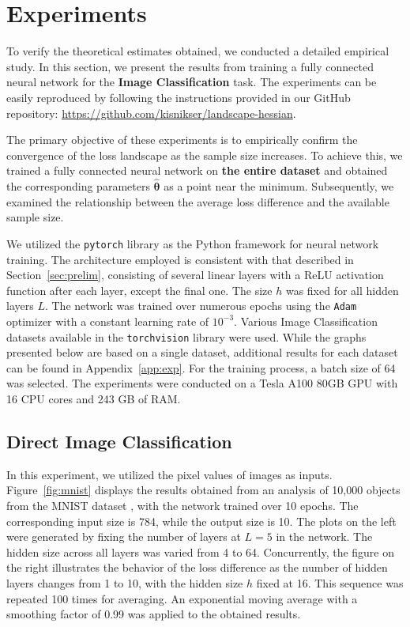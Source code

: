 \documentclass{article}
\begin{document}
\section{Experiments}\label{sec:exp}

To verify the theoretical estimates obtained, we conducted a detailed empirical study. In this section, we present the results from training a fully connected neural network for the \textbf{Image Classification} task. The experiments can be easily reproduced by following the instructions provided in our GitHub repository: \href{https://github.com/kisnikser/landscape-hessian}{https://github.com/kisnikser/landscape-hessian}.

The primary objective of these experiments is to empirically confirm the convergence of the loss landscape as the sample size increases. To achieve this, we trained a fully connected neural network on \textbf{the entire dataset} and obtained the corresponding parameters $\hat{\boldsymbol{\theta}}$ as a point near the minimum. Subsequently, we examined the relationship between the average loss difference and the available sample size.

We utilized the \texttt{pytorch} library \cite{pytorch} as the Python framework for neural network training. The architecture employed is consistent with that described in Section~\ref{sec:prelim}, consisting of several linear layers with a ReLU activation function after each layer, except the final one. The size $h$ was fixed for all hidden layers $L$. The network was trained over numerous epochs using the \texttt{Adam} optimizer \cite{adam} with a constant learning rate of $10^{-3}$. Various Image Classification datasets available in the \texttt{torchvision} library were used. While the graphs presented below are based on a single dataset, additional results for each dataset can be found in Appendix~\ref{app:exp}. For the training process, a batch size of 64 was selected. The experiments were conducted on a Tesla A100 80GB GPU with 16 CPU cores and 243 GB of RAM.

\subsection{Direct Image Classification}

In this experiment, we utilized the pixel values of images as inputs. Figure~\ref{fig:mnist} displays the results obtained from an analysis of 10,000 objects from the MNIST dataset \cite{deng2012mnist}, with the network trained over 10 epochs. The corresponding input size is 784, while the output size is 10. The plots on the left were generated by fixing the number of layers at $L=5$ in the network. The hidden size across all layers was varied from 4 to 64. Concurrently, the figure on the right illustrates the behavior of the loss difference as the number of hidden layers changes from 1 to 10, with the hidden size $h$ fixed at 16. This sequence was repeated 100 times for averaging. An exponential moving average with a smoothing factor of 0.99 was applied to the obtained results.
\end{document}
